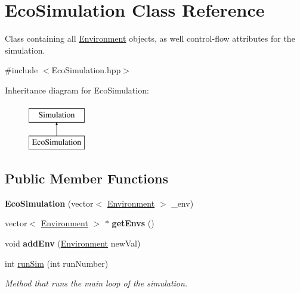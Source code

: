 \hypertarget{classEcoSimulation}{}\section{Eco\+Simulation Class Reference}
\label{classEcoSimulation}


Class containing all \hyperlink{classEnvironment}{Environment} objects, as well control-\/flow attributes for the simulation.  




{\ttfamily \#include $<$Eco\+Simulation.\+hpp$>$}

Inheritance diagram for Eco\+Simulation\+:\begin{figure}[H]
\begin{center}
\leavevmode
\includegraphics[height=2.000000cm]{classEcoSimulation}
\end{center}
\end{figure}
\subsection*{Public Member Functions}
\begin{DoxyCompactItemize}
\item 
\mbox{\label{classEcoSimulation_a25ae3cf6161e29e0934100e61cfbeff2}} 
{\bfseries Eco\+Simulation} (vector$<$ \hyperlink{classEnvironment}{Environment} $>$ \+\_\+env)
\item 
\mbox{\label{classEcoSimulation_a36abdefbbb5c3e6e06754f23860b9d8c}} 
vector$<$ \hyperlink{classEnvironment}{Environment} $>$ $\ast$ {\bfseries get\+Envs} ()
\item 
\mbox{\label{classEcoSimulation_a36bafa7e479df22a6ab993f21648817f}} 
void {\bfseries add\+Env} (\hyperlink{classEnvironment}{Environment} new\+Val)
\item 
int \hyperlink{classEcoSimulation_a72ec5e7dffb4231b2cb363b632788622}{run\+Sim} (int run\+Number)
\begin{DoxyCompactList}\small\item\em Method that runs the main loop of the simulation. \end{DoxyCompactList}\end{DoxyCompactItemize}
